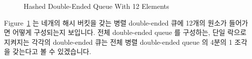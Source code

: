 \begin{figure}[tb]
\begin{center}
\end{center}
\caption{Hashed Double-Ended Queue With 12 Elements}
\label{fig:SMPdesign:Hashed Double-Ended Queue With 12 Elements}
\end{figure}

Figure~\ref{fig:SMPdesign:Hashed Double-Ended Queue With 12 Elements} 는 네개의
해시 버킷을 갖는 병렬 double-ended 큐에 12개의 원소가 들어가면 어떻게
구성되는지 보입니다.
전체 double-ended queue 를 구성하는, 단일 락으로 지켜지는 각각의 double-ended
큐는 전체 병렬 double-ended queue 의 4분의 1 조각을 갖는다고 볼 수 있겠습니다.

